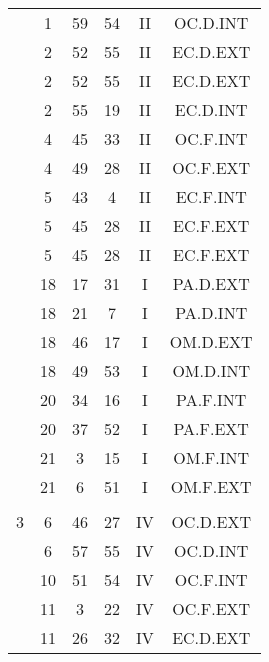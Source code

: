 \documentclass[12pt, a4paper]{article}
\begin{document}
\begin{multicols}{3}
{\begin{tabular}{c c c c c c}
	 	 	 	 & 1 & 59 & 54 & II & OC.D.INT\\%
	 	 	 	 & 2 & 52 & 55 & II & EC.D.EXT\\%
	 	 	 	 & 2 & 52 & 55 & II & EC.D.EXT\\%
	 	 	 	 & 2 & 55 & 19 & II & EC.D.INT\\%
	 	 	 	 & 4 & 45 & 33 & II & OC.F.INT\\%
	 	 	 	 & 4 & 49 & 28 & II & OC.F.EXT\\%
	 	 	 	 & 5 & 43 & 4 & II & EC.F.INT\\%
	 	 	 	 & 5 & 45 & 28 & II & EC.F.EXT\\%
	 	 	 	 & 5 & 45 & 28 & II & EC.F.EXT\\%
	 	 	 	 & 18 & 17 & 31 & I & PA.D.EXT\\%
	 	 	 	 & 18 & 21 & 7 & I & PA.D.INT\\%
	 	 	 	 & 18 & 46 & 17 & I & OM.D.EXT\\%
	 	 	 	 & 18 & 49 & 53 & I & OM.D.INT\\%
	 	 	 	 & 20 & 34 & 16 & I & PA.F.INT\\%
	 	 	 	 & 20 & 37 & 52 & I & PA.F.EXT\\%
	 	 	 	 & 21 & 3 & 15 & I & OM.F.INT\\%
	 	 	 	 & 21 & 6 & 51 & I & OM.F.EXT\\%
	 	 	 	 & & & & & \\%
	 	 	 	3 & 6 & 46 & 27 & IV & OC.D.EXT\\%
	 	 	 	 & 6 & 57 & 55 & IV & OC.D.INT\\%
	 	 	 	 & 10 & 51 & 54 & IV & OC.F.INT\\%
	 	 	 	 & 11 & 3 & 22 & IV & OC.F.EXT\\%
	 	 	 	 & 11 & 26 & 32 & IV & EC.D.EXT\\%

\end{tabular}}
\end{multicols}
\end{document}
